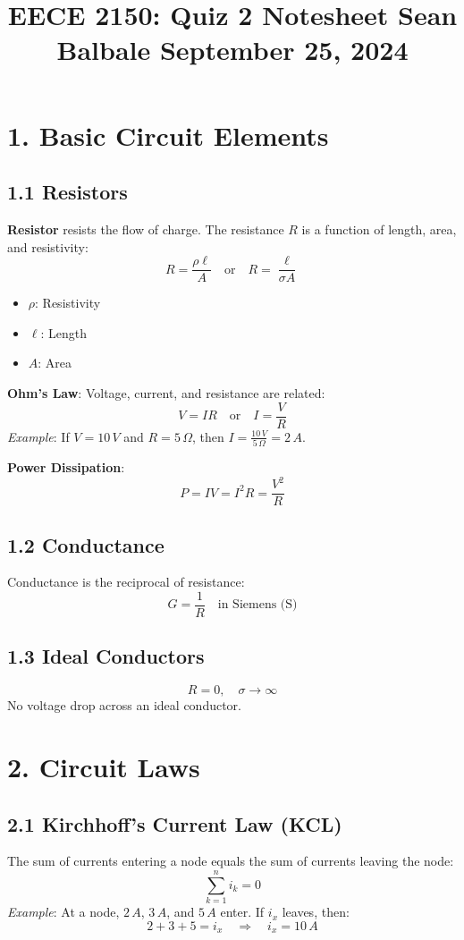 \documentclass[10pt]{article}
\title{
    \raggedright
    \large EECE 2150: Quiz 2 Notesheet \hfill Sean Balbale \hfill September 25, 2024
    \vspace{-4em}
}
\date{}
\begin{document}
\maketitle

\begin{multicols}{2}

\section*{1. Basic Circuit Elements}

\subsection*{1.1 Resistors}
\textbf{Resistor} resists the flow of charge. The resistance \(R\) is a function of length, area, and resistivity:
\[
R = \frac{\rho \ell}{A} \quad \text{or} \quad R = \frac{\ell}{\sigma A}
\]
\begin{itemize}\itemsep0pt
    \item \( \rho \): Resistivity
    \item \( \ell \): Length
    \item \( A \): Area
\end{itemize}
\textbf{Ohm's Law}: Voltage, current, and resistance are related:
\[
V = IR \quad \text{or} \quad I = \frac{V}{R}
\]
\textit{Example}: If \(V = 10\,V\) and \(R = 5\,\Omega\), then \(I = \frac{10\,V}{5\,\Omega} = 2\,A\).

\textbf{Power Dissipation}:
\[
P = IV = I^2 R = \frac{V^2}{R}
\]

\subsection*{1.2 Conductance}
Conductance is the reciprocal of resistance:
\[
G = \frac{1}{R} \quad \text{in Siemens (S)}
\]

\subsection*{1.3 Ideal Conductors}
\[
R = 0, \quad \sigma \to \infty
\]
No voltage drop across an ideal conductor.

\section*{2. Circuit Laws}

\subsection*{2.1 Kirchhoff's Current Law (KCL)}
The sum of currents entering a node equals the sum of currents leaving the node:
\[
\sum_{k=1}^{n} i_k = 0
\]
\textit{Example}: At a node, \(2\,A\), \(3\,A\), and \(5\,A\) enter. If \(i_x\) leaves, then:
\[
2 + 3 + 5 = i_x \quad \Rightarrow \quad i_x = 10\,A
\]


\end{multicols}
\end{document}
